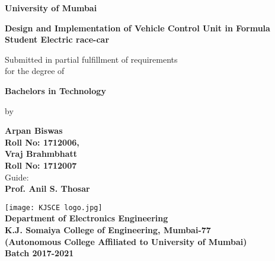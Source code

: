 \begin{titlepage}
    \begin{center}
        \vspace*{0.1cm}
          
        \LARGE
        \textbf{University of Mumbai}
        \vspace{0.5cm}
        
        \LARGE
        \textbf{Design and Implementation of Vehicle Control Unit in Formula Student Electric race-car}
         
        \par 
        \large
        Submitted in partial fulfillment of requirements\\
        for the degree of\\
        \Large
        \par
        \textbf{Bachelors in Technology}
        
        \large
        \par
        by
        
        \Large
        \par
        \textbf{Arpan Biswas\\ Roll No: 1712006,\\ \vspace{0.5cm} Vraj Brahmbhatt\\ Roll No: 1712007}\\
        
        \large
        \vspace{0.5cm}
        Guide:\\
        \Large
        \textbf{Prof. Anil S. Thosar}
            
        \vfill
            
        \vspace{0.5cm}
            
        \texttt{[image: KJSCE logo.jpg]}\\
        \vspace{0.5cm}   
        \large
        \textbf{Department of Electronics Engineering}\\
        \textbf{K.J. Somaiya College of Engineering, Mumbai-77}\\
        \normalsize
        \textbf{(Autonomous College Affiliated to University of Mumbai)}\\
        \vspace{0.5cm}
        \large
        \textbf{Batch 2017-2021}\\
        \vspace{0.8cm}

    \end{center}
\end{titlepage}
